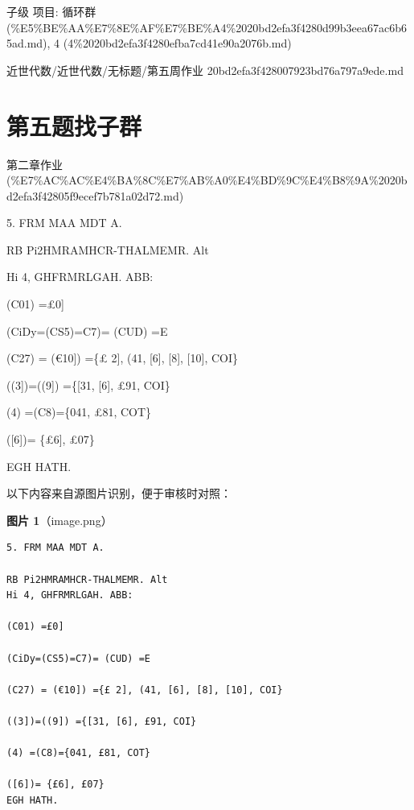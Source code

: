 \begin{homework}

子级 项目: 循环群 (\%E5\%BE\%AA\%E7\%8E\%AF\%E7\%BE\%A4\%2020bd2efa3f4280d99b3eea67ac6b65ad.md), 4 (4\%2020bd2efa3f4280efba7cd41e90a2076b.md)

\end{homework}

\begin{note}[来源路径]

近世代数/近世代数/无标题/第五周作业 20bd2efa3f428007923bd76a797a9ede.md

\end{note}

\section*{第五题找子群}

\begin{note}[来源上级主题]

第二章作业 (\%E7\%AC\%AC\%E4\%BA\%8C\%E7\%AB\%A0\%E4\%BD\%9C\%E4\%B8\%9A\%2020bd2efa3f42805f9ecef7b781a02d72.md)

\end{note}

\begin{homework}

5. FRM MAA MDT A.

RB Pi2HMRAMHCR-THALMEMR. Alt

Hi 4, GHFRMRLGAH. ABB:

(C01) =£0]

(CiDy=(CS5)=C7)= (CUD) =E

(C27) = (€10]) =\{£ 2], (41, [6], [8], [10], COI\}

((3])=((9]) =\{[31, [6], £91, COI\}

(4) =(C8)=\{041, £81, COT\}

([6])= \{£6], £07\}

EGH HATH.

\end{homework}

\begin{note}
以下内容来自源图片识别，便于审核时对照：

\textbf{图片 1}（image.png）
\begin{Verbatim}[fontsize=\small]
5. FRM MAA MDT A.

RB Pi2HMRAMHCR-THALMEMR. Alt
Hi 4, GHFRMRLGAH. ABB:

(C01) =£0]

(CiDy=(CS5)=C7)= (CUD) =E

(C27) = (€10]) ={£ 2], (41, [6], [8], [10], COI}

((3])=((9]) ={[31, [6], £91, COI}

(4) =(C8)={041, £81, COT}

([6])= {£6], £07}
EGH HATH.
\end{Verbatim}

\end{note}

